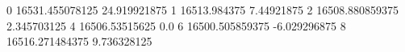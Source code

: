 0 16531.455078125 24.919921875
1 16513.984375 7.44921875
2 16508.880859375 2.345703125
4 16506.53515625 0.0
6 16500.505859375 -6.029296875
8 16516.271484375 9.736328125

